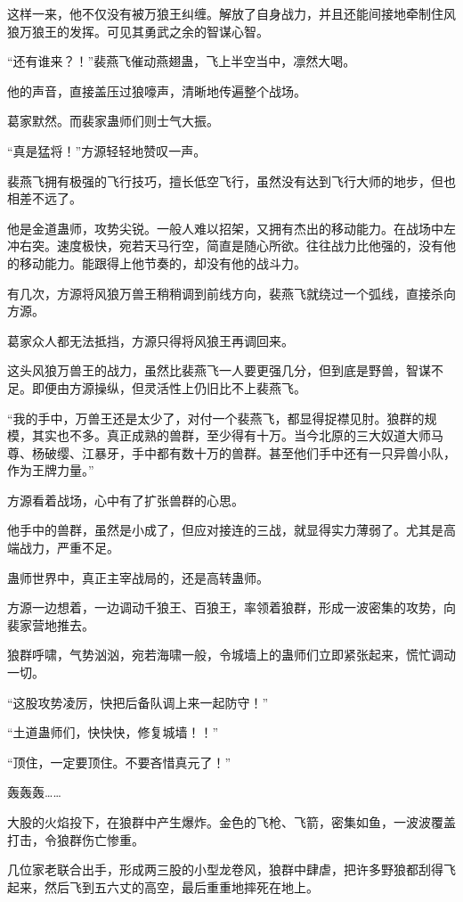 \begin{this_body}
这样一来，他不仅没有被万狼王纠缠。解放了自身战力，并且还能间接地牵制住风狼万狼王的发挥。可见其勇武之余的智谋心智。

“还有谁来？！”裴燕飞催动燕翅蛊，飞上半空当中，凛然大喝。

他的声音，直接盖压过狼嚎声，清晰地传遍整个战场。

葛家默然。而裴家蛊师们则士气大振。

“真是猛将！”方源轻轻地赞叹一声。

裴燕飞拥有极强的飞行技巧，擅长低空飞行，虽然没有达到飞行大师的地步，但也相差不远了。

他是金道蛊师，攻势尖锐。一般人难以招架，又拥有杰出的移动能力。在战场中左冲右突。速度极快，宛若天马行空，简直是随心所欲。往往战力比他强的，没有他的移动能力。能跟得上他节奏的，却没有他的战斗力。

有几次，方源将风狼万兽王稍稍调到前线方向，裴燕飞就绕过一个弧线，直接杀向方源。

葛家众人都无法抵挡，方源只得将风狼王再调回来。

这头风狼万兽王的战力，虽然比裴燕飞一人要更强几分，但到底是野兽，智谋不足。即便由方源操纵，但灵活性上仍旧比不上裴燕飞。

“我的手中，万兽王还是太少了，对付一个裴燕飞，都显得捉襟见肘。狼群的规模，其实也不多。真正成熟的兽群，至少得有十万。当今北原的三大奴道大师马尊、杨破缨、江暴牙，手中都有数十万的兽群。甚至他们手中还有一只异兽小队，作为王牌力量。”

方源看着战场，心中有了扩张兽群的心思。

他手中的兽群，虽然是小成了，但应对接连的三战，就显得实力薄弱了。尤其是高端战力，严重不足。

蛊师世界中，真正主宰战局的，还是高转蛊师。

方源一边想着，一边调动千狼王、百狼王，率领着狼群，形成一波密集的攻势，向裴家营地推去。

狼群呼啸，气势汹汹，宛若海啸一般，令城墙上的蛊师们立即紧张起来，慌忙调动一切。

“这股攻势凌厉，快把后备队调上来一起防守！”

“土道蛊师们，快快快，修复城墙！！”

“顶住，一定要顶住。不要吝惜真元了！”

轰轰轰……

大股的火焰投下，在狼群中产生爆炸。金色的飞枪、飞箭，密集如鱼，一波波覆盖打击，令狼群伤亡惨重。

几位家老联合出手，形成两三股的小型龙卷风，狼群中肆虐，把许多野狼都刮得飞起来，然后飞到五六丈的高空，最后重重地摔死在地上。


\end{this_body}
